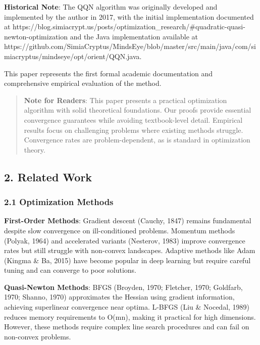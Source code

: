 \textbf{Historical Note}: The QQN algorithm was originally developed and implemented by the author in 2017, with the initial implementation documented at https://blog.simiacrypt.us/posts/optimization\_research/\#quadratic-quasi-newton-optimization and the Java implementation available at https://github.com/SimiaCryptus/MindsEye/blob/master/src/main/java/com/simiacryptus/mindseye/opt/orient/QQN.java.

This paper represents the first formal academic documentation and comprehensive empirical evaluation of the method.

\begin{quote}
\textbf{Note for Readers}: This paper presents a practical optimization algorithm with solid theoretical foundations.
Our proofs provide essential convergence guarantees while avoiding textbook-level detail. Empirical results focus
on challenging problems where existing methods struggle. Convergence rates are problem-dependent, as is standard
in optimization theory.
\end{quote}

\hypertarget{related-work}{%
\subsection{2. Related Work}\label{related-work}}

\hypertarget{optimization-methods}{%
\subsubsection{2.1 Optimization Methods}\label{optimization-methods}}

\textbf{First-Order Methods}: Gradient descent (Cauchy, 1847) remains fundamental despite slow convergence on ill-conditioned problems.
Momentum methods (Polyak, 1964) and accelerated variants (Nesterov, 1983) improve convergence rates but still struggle with non-convex landscapes.
Adaptive methods like Adam (Kingma \& Ba, 2015) have become popular in deep learning but require careful tuning and can converge to poor solutions.

\textbf{Quasi-Newton Methods}: BFGS (Broyden, 1970; Fletcher, 1970; Goldfarb, 1970; Shanno, 1970) approximates the Hessian using gradient information, achieving superlinear convergence near optima.
L-BFGS (Liu \& Nocedal, 1989) reduces memory requirements to O(mn), making it practical for high dimensions.
However, these methods require complex line search procedures and can fail on non-convex problems.

